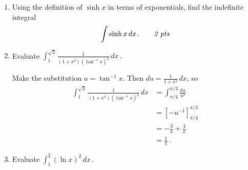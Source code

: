 \documentclass{msi-exam}
\begin{document}

\begin{question}{10}
\begin{enumerate}
\item Using the definition of $\sinh x$ in terms of exponentials, find the indefinite integral
\begin{equation*}
\int\sinh x\,dx\,.\tag*{\subpoints{2}}
\end{equation*}

\workspace 


\item Evaluate $\displaystyle{\int_{1}^{\sqrt3}\frac{1}{(1+x^2)(\tan^{-1} x)^2}\,dx\,.}$

\workspace 

\begin{answer}
Make the substitution $u=\tan^{-1}x$. Then $du=\frac{1}{1+x^2}\, dx$, so 
\begin{align*}
\int_{1}^{\sqrt3}\frac{1}{(1+x^2)(\tan^{-1} x)^2}\,dx
  &= \int_{\pi/4}^{\pi/3} \frac{du}{u^{2}} \\[5pt]
  &= \left[-u^{-1}\right]_{\pi/4}^{\pi/3} \\[5pt]
  &= -\frac3\pi+\frac4\pi\\[5pt]
  &=\frac1\pi\,. 
\end{align*}
\end{answer}


\newpage
\item Evaluate $\displaystyle{\int_1^{2} (\ln x)^2\,dx\,.}$

\workspace 

\begin{answer}
 

\end{answer}
\end{enumerate}
\end{question}
\end{document}
